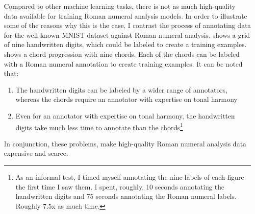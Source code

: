 

Compared to other machine learning tasks, there is not as
much high-quality data available for training Roman numeral
analysis models. In order to illustrate some of the reasons
why this is the case, I contrast the process of annotating
data for the well-known MNIST dataset
\cite{lecun1989handwritten} against Roman numeral analysis.
 shows a grid of nine handwritten digits,
which could be labeled to create a training examples.
 shows a chord progression with nine chords.
Each of the chords can be labeled with a Roman numeral
annotation to create training examples. It can be noted
that:

\begin{enumerate}
    \item The handwritten digits can be labeled by a wider
    range of annotators, whereas the chords require an annotator with expertise on tonal harmony
    \item Even for an annotator with expertise on tonal harmony, the handwritten digits take much less time to annotate than the chords\footnote{As an informal test, I timed myself annotating the nine labels of each figure the first time I saw them. I spent, roughly, 10 seconds annotating the handwritten digits and 75 seconds annotating the Roman numeral labels. Roughly 7.5x as much time.}
\end{enumerate}

In conjunction, these problems, make high-quality Roman numeral analysis data expensive and scarce.


